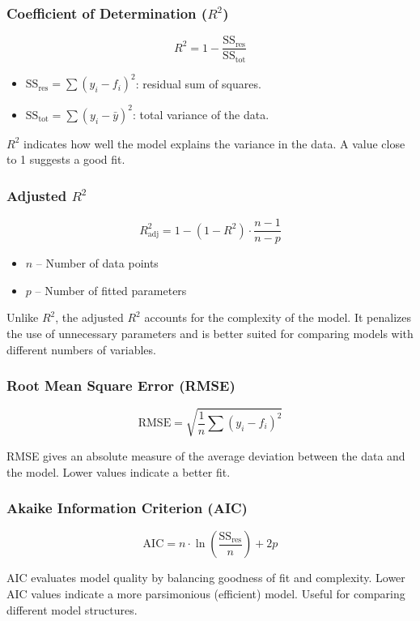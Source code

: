 \subsubsection*{Coefficient of Determination ($R^2$)}
\[
R^2 = 1 - \frac{\mathrm{SS}_{\mathrm{res}}}{\mathrm{SS}_{\mathrm{tot}}}
\]
\begin{itemize}
    \item $\mathrm{SS}_{\mathrm{res}} = \sum (y_i - f_i)^2$: residual sum of squares.
    \item $\mathrm{SS}_{\mathrm{tot}} = \sum (y_i - \bar{y})^2$: total variance of the data.
\end{itemize}

$R^2$ indicates how well the model explains the variance in the data. A value close to 1 suggests a good fit.

\subsubsection*{Adjusted $R^2$}
\[
R^2_{\mathrm{adj}} = 1 - (1 - R^2) \cdot \frac{n - 1}{n - p}
\]
\begin{itemize}
    \item $n$ – Number of data points
    \item $p$ – Number of fitted parameters
\end{itemize}

Unlike $R^2$, the adjusted $R^2$ accounts for the complexity of the model. It penalizes the use of unnecessary parameters and is better suited for comparing models with different numbers of variables.

\subsubsection*{Root Mean Square Error (RMSE)}
\[
\mathrm{RMSE} = \sqrt{ \frac{1}{n} \sum (y_i - f_i)^2 }
\]

RMSE gives an absolute measure of the average deviation between the data and the model. Lower values indicate a better fit.

\subsubsection*{Akaike Information Criterion (AIC)}
\[
\mathrm{AIC} = n \cdot \ln\left(\frac{\mathrm{SS}_{\mathrm{res}}}{n}\right) + 2p
\]

AIC evaluates model quality by balancing goodness of fit and complexity. Lower AIC values indicate a more parsimonious (efficient) model. Useful for comparing different model structures.

